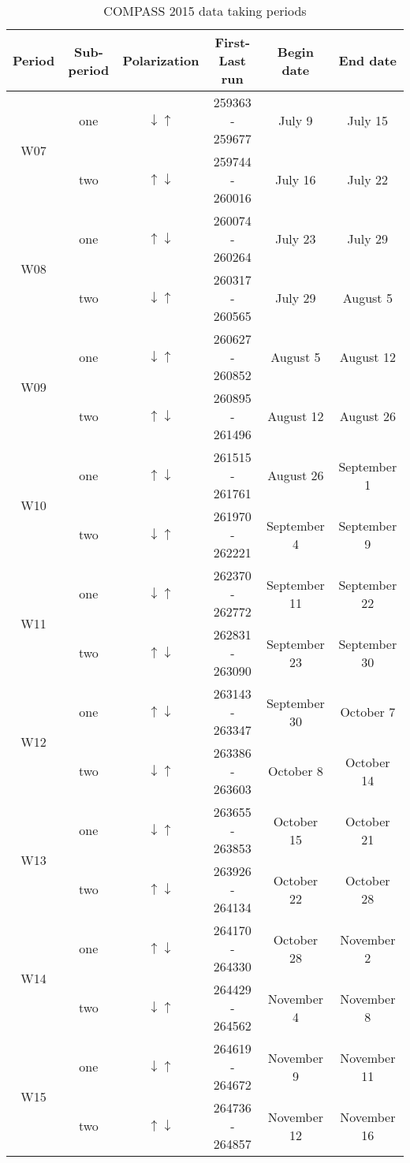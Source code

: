 \begin{table}[h!t]
  \centering
  \begin{tabular}{ |c|c|c|c|c|c| }
    \hline Period& Sub-period& Polarization& First-Last run& Begin date& End
    date \\ \hline
    
    \multirow{2}{2em}{W07}& one& $\downarrow \uparrow$& 259363 - 259677& July
    9& July 15 \\ & two& $\uparrow \downarrow$& 259744 - 260016& July 16& July
    22 \\ \hline

    \multirow{2}{2em}{W08}& one& $\uparrow \downarrow$& 260074 - 260264& July
    23& July 29 \\ & two& $\downarrow \uparrow$& 260317 - 260565& July 29&
    August 5 \\ \hline

    \multirow{2}{2em}{W09}& one& $\downarrow \uparrow$& 260627 - 260852&
    August 5& August 12 \\ & two& $\uparrow \downarrow$& 260895 - 261496&
    August 12& August 26 \\ \hline

    \multirow{2}{2em}{W10}& one& $\uparrow \downarrow$& 261515 - 261761&
    August 26& September 1 \\ & two& $\downarrow \uparrow$& 261970 - 262221&
    September 4& September 9 \\ \hline

    \multirow{2}{2em}{W11}& one& $\downarrow \uparrow$& 262370 - 262772&
    September 11& September 22 \\ & two& $\uparrow \downarrow$& 262831 -
    263090& September 23& September 30 \\ \hline

    \multirow{2}{2em}{W12}& one& $\uparrow \downarrow$& 263143 - 263347&
    September 30& October 7 \\ & two& $\downarrow \uparrow$& 263386 - 263603&
    October 8& October 14 \\ \hline

    \multirow{2}{2em}{W13}& one& $\downarrow \uparrow$& 263655 - 263853&
    October 15& October 21 \\ & two& $\uparrow \downarrow$& 263926 - 264134&
    October 22& October 28 \\ \hline

    \multirow{2}{2em}{W14}& one& $\uparrow \downarrow$& 264170 - 264330&
    October 28& November 2 \\ & two& $\downarrow \uparrow$& 264429 - 264562&
    November 4& November 8 \\ \hline

    \multirow{2}{2em}{W15}& one& $\downarrow \uparrow$& 264619 - 264672&
    November 9& November 11 \\ & two& $\uparrow \downarrow$& 264736 - 264857&
    November 12& November 16 \\ \hline
    
  \end{tabular}
  \caption{COMPASS 2015 data taking periods}
  \label{tab::datataking}
\end{table}

